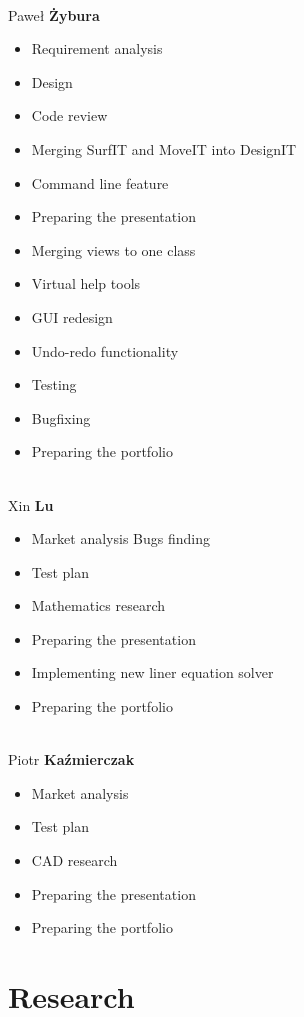 \documentclass[a4paper, 11pt, article]{report}
\begin{document}
\noindent \\ Paweł \textbf{Żybura} 
\begin{itemize}
	\item Requirement analysis
	\item Design
	\item Code review
	\item Merging SurfIT and MoveIT into DesignIT
	\item Command line feature
	\item Preparing the presentation
	\item Merging views to one class
	\item Virtual help tools
	\item GUI redesign
	\item Undo-redo functionality
	\item Testing 
	\item Bugfixing
	\item Preparing the portfolio
\end{itemize}

\noindent \\ Xin \textbf{Lu}
\begin{itemize}
	\itme Lecture review
	\item Market analysis
	\itme Bugs finding
	\item Test plan
	\item Mathematics research
	\item Preparing the presentation
	\item Implementing new liner equation solver
	\item Preparing the portfolio
\end{itemize}

\noindent \\ Piotr \textbf{Kaźmierczak} 
\begin{itemize}
	\item Market analysis
	\item Test plan
	\item CAD research
	\item Preparing the presentation
	\item Preparing the portfolio
\end{itemize}



\chapter{Research}
\end{document}
